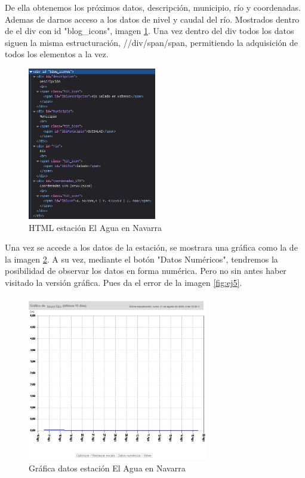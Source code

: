 De ella obtenemos los próximos datos, descripción, municipio, río y coordenadas. Ademas de darnos acceso a los datos de nivel y caudal del río. Mostrados dentro de el div con id "blog\_icons", imagen \ref{fig:ej24}. Una vez dentro del div todos los datos siguen la misma estructuración, //div/span/span, permitiendo la adquisición de todos los elementos a la vez.

\begin{figure} [H]
	\centering
	\includegraphics[width=0.5\textwidth]{fig/AguaEnNavarraEstacionHTML.png}
	\caption[HTML estación de El Agua en Navarra]{HTML estación El Agua en Navarra}
	\label{fig:ej24}
\end{figure}

Una vez se accede a los datos de la estación, se mostrara una gráfica como la de la imagen \ref{fig:ej25}. A su vez, mediante el botón "Datos Numéricos", tendremos la posibilidad de observar los datos en forma numérica. Pero no sin antes haber visitado la versión gráfica. Pues da el error de la imagen \ref{fig:ej5}.

\begin{figure} [H]
	\centering
	\includegraphics[width=0.7\textwidth]{fig/AguaEnNavarraGrafica.png}
	\caption[Gráfica de datos en estación de El Agua en Navarra]{Gráfica datos estación El Agua en Navarra}
	\label{fig:ej25}
\end{figure}

